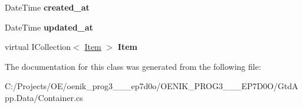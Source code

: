 \begin{DoxyCompactItemize}
\item 
\mbox{\label{class_gtd_app_1_1_data_1_1_container_af618b3b318befa872633ef3a2cb91978}} 
Date\+Time {\bfseries created\+\_\+at}
\item 
\mbox{\label{class_gtd_app_1_1_data_1_1_container_a04ea75257f82e9d1e913ce42e05e3bab}} 
Date\+Time {\bfseries updated\+\_\+at}
\item 
\mbox{\label{class_gtd_app_1_1_data_1_1_container_adb3e31a325d99e9f5b8440fc5fc67815}} 
virtual I\+Collection$<$ \mbox{\hyperlink{class_gtd_app_1_1_data_1_1_item}{Item}} $>$ {\bfseries Item}
\end{DoxyCompactItemize}


The documentation for this class was generated from the following file\+:\begin{DoxyCompactItemize}
\item 
C\+:/\+Projects/\+O\+E/oenik\+\_\+prog3\+\_\+\_\+\_\+ep7d0o/\+O\+E\+N\+I\+K\+\_\+\+P\+R\+O\+G3\+\_\+\_\+\_\+\+E\+P7\+D0\+O/\+Gtd\+App.\+Data/Container.\+cs\end{DoxyCompactItemize}
